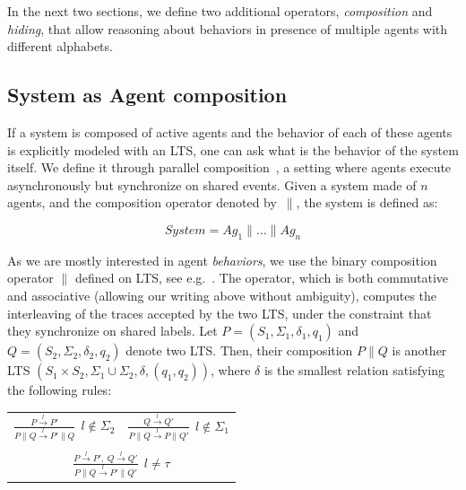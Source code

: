 In the next two sections, we define two additional operators, \emph{composition} and \emph{hiding}, that allow reasoning about behaviors in presence of multiple agents with different alphabets.

\subsection{System as Agent composition}

If a system is composed of active agents and the behavior of each of these agents is explicitly modeled with an LTS, one can ask what is the behavior of the system itself. We define it through parallel composition~\cite{Hoare:1985}, a setting where agents execute asynchronously but synchronize on shared events. Given a system made of $n$ agents, and the composition operator denoted by~$\parallel$, the system is defined as:

\begin{equation}
System = Ag_1 \parallel \ldots \parallel Ag_n
\end{equation}

As we are mostly interested in agent \emph{behaviors}, we use the binary composition operator $\parallel$ defined on LTS, see e.g.~\cite{Giannakopoulou:1999, Magee:1999}. The operator, which is both commutative and associative (allowing our writing above without ambiguity), computes the interleaving of the traces accepted by the two LTS, under the constraint that they synchronize on shared labels. Let $P = (S_1,\Sigma_1,\delta_1,q_{1})$ and $Q = (S_2,\Sigma_2,\delta_2,q_{2})$ denote two LTS. Then, their composition $P \parallel Q$ is another LTS $(S_1 \times S_2,\Sigma_1\cup\Sigma_2,\delta,(q_1,q_2))$, where $\delta$ is the smallest relation satisfying the following rules:

\begin{center}
\begin{tabular}{cc}
$\frac{\displaystyle P \stackrel{l}{\longrightarrow} P'}{\displaystyle P \parallel Q \stackrel{l}{\longrightarrow} P' \parallel Q}~~l \notin \Sigma_2$ &
$\frac{\displaystyle Q \stackrel{l}{\longrightarrow} Q'}{\displaystyle P \parallel Q \stackrel{l}{\longrightarrow} P \parallel Q'}~~l \notin \Sigma_1$ \\
 & \\
\multicolumn{2}{c}{$\frac{\displaystyle P \stackrel{l}{\longrightarrow} P',~Q \stackrel{l}{\longrightarrow} Q'}{\displaystyle P \parallel Q \stackrel{l}{\longrightarrow} P' \parallel Q'}~~l \neq \tau$} \\
\end{tabular}
\end{center}

